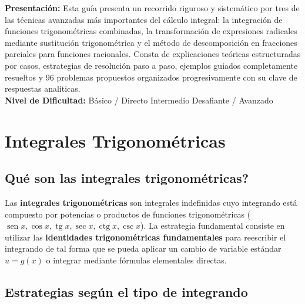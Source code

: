 \documentclass[12pt, letterpaper]{article}
\DeclareMathOperator{\sen}{sen}
\DeclareMathOperator{\tg}{tg}
\DeclareMathOperator{\ctg}{ctg}
\begin{document}


\vspace{4pt}
\begin{cuadroinfo}
\small
\textbf{Presentación:} Esta guía presenta un recorrido riguroso y sistemático por tres de las técnicas avanzadas más importantes del cálculo integral: la integración de funciones trigonométricas combinadas, la transformación de expresiones radicales mediante sustitución trigonométrica y el método de descomposición en fracciones parciales para funciones racionales.
Consta de explicaciones teóricas estructuradas por casos, estrategias de resolución paso a paso, ejemplos guiados completamente resueltos y 96 problemas propuestos organizados progresivamente con su clave de respuestas analíticas.
\\[4pt]
\textbf{Nivel de Dificultad:}\quad
\facil{} Básico / Directo \quad
\medio{} Intermedio \quad
\dificil{} Desafiante / Avanzado
\end{cuadroinfo}

\vspace{8pt}

\section{Integrales Trigonométricas}

\subsection{\textquestiondown Qué son las integrales trigonométricas?}
Las \textbf{integrales trigonométricas} son integrales indefinidas cuyo integrando está compuesto por potencias o productos de funciones trigonométricas ($\sen x, \cos x, \tg x, \sec x, \ctg x, \csc x$). 
La estrategia fundamental consiste en utilizar las \textbf{identidades trigonométricas fundamentales} para reescribir el integrando de tal forma que se pueda aplicar un cambio de variable estándar $u = g(x)$ o integrar mediante fórmulas elementales directas.

\subsection{Estrategias según el tipo de integrando}
\end{document}
